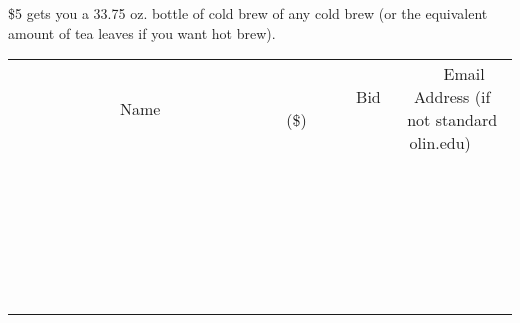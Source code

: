 \documentclass[11pt]{article}
\begin{document}
\$5 gets you a 33.75 oz. bottle of cold brew of any cold brew (or the equivalent amount of tea leaves if you want hot brew).
\\[6ex]
\begin{tabular}{c c c}
~~~~~~~~~~~~~Name~~~~~~~~~~~~~ & ~~~~~~~~~Bid (\$)~~~~~~~~~  & ~~~Email Address (if not standard olin.edu)~~~\\
 & & \\
\hline
 & & \\
\hline
 & & \\
\hline
 & & \\
\hline
 & & \\
\hline
 & & \\
\hline
 & & \\
\hline
 & & \\
\hline
 & & \\
\hline
 & & \\
\hline
 & & \\
\hline
 & & \\
\hline
 & & \\
\hline
 & & \\
\hline
 & & \\
\hline
 & & \\
\hline
 & & \\
\hline
 & & \\
\hline
 & & \\
\hline
 & & \\
\hline
 & & \\
\hline
 & & \\
\hline
 & & \\
\hline
 & & \\
\hline
 & & \\
\hline
 & & \\
\hline
\end{tabular}
\newpage
\end{document}
